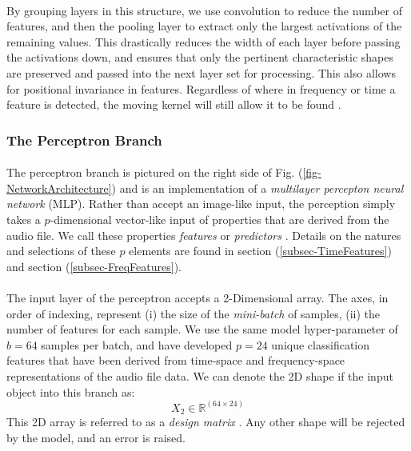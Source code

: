 \documentclass[12pt,letterpaper]{article}
\begin{document}
\paragraph*{}By grouping layers in this structure, we use convolution to reduce the number of features, and then the pooling layer to extract only the largest activations of the remaining values. This drastically reduces the width of each layer before passing the activations down, and ensures that only the pertinent characteristic shapes are preserved and passed into the next layer set for processing. This also allows for positional invariance in features. Regardless of where in frequency or time a feature is detected, the moving kernel will still allow it to be found \cite{Goodfellow,Loy}.


\subsubsection{The Perceptron Branch}

\paragraph*{}The perceptron branch is pictured on the right side of Fig. (\ref{fig-NetworkArchitecture}) and is an implementation of a \textit{multilayer percepton neural network} (MLP). Rather than accept an image-like input, the perception simply takes a $p$-dimensional vector-like input of properties that are derived from the audio file. We call these properties \textit{features} or \textit{predictors} \cite{Geron,Khan,Serizel}. Details on the natures and selections of these $p$ elements are found in section (\ref{subsec-TimeFeatures}) and section (\ref{subsec-FreqFeatures}).

\paragraph*{}The input layer of the perceptron accepts a 2-Dimensional array. The axes, in order of indexing, represent (i) the size of the \textit{mini-batch} of samples, (ii) the number of features for each sample. We use the same model hyper-parameter of $b = 64$ samples per batch, and have developed $p = 24$ unique classification features that have been derived from time-space and frequency-space representations of the audio file data. We can denote the 2D shape if the input object into this branch as:
\begin{equation}
\label{eqn-shapeX2}
X_2 \in \mathbb{R}^{(64 \times 24)}
\end{equation}
This 2D array is referred to as a \textit{design matrix} \cite{James,Loy}. Any other shape will be rejected by the model, and an error is raised.
\end{document}
